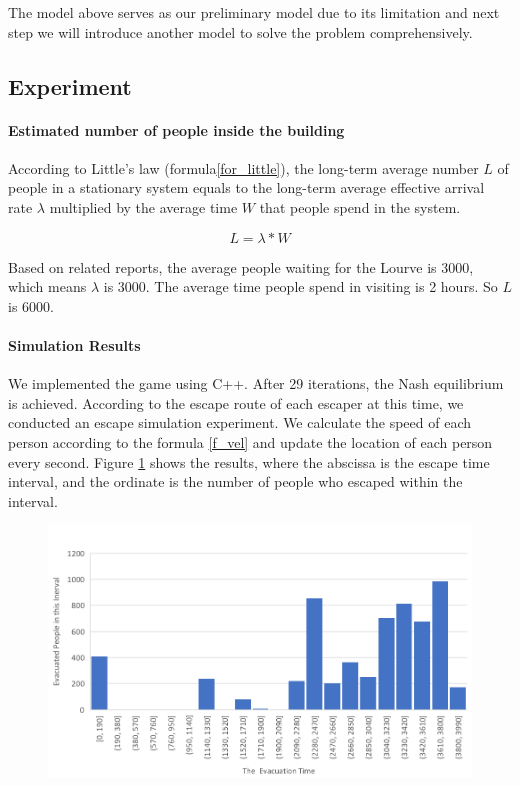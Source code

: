 \documentclass{mcmthesis}
\begin{document}
	The model above serves as our preliminary model due to its limitation and next step we will introduce another model to solve the problem comprehensively.
	
	\subsection{Experiment}
	
	\paragraph{Estimated number of people inside the building}
	According to Little's law (formula\ref{for_little}), the long-term average number $L$ of people in a stationary system equals to the long-term average effective arrival rate $\lambda$ multiplied by the average time $W$ that people spend in the system.
	
	\begin{equation}
	{L=\lambda*W}
	\label{for_little}
	\end{equation}
	
	Based on related reports\cite{waittime}, the average people waiting for the Lourve is 3000, which means $\lambda$ is 3000. The average time people spend in visiting is 2 hours. So $L$ is 6000.
	
	
	
	\paragraph{Simulation Results}
	We implemented the game using C++. After 29 iterations, the Nash equilibrium is achieved.  According to the escape route of each escaper at this time, we conducted an escape simulation experiment. We calculate the speed of each person according to the formula \ref{f_vel} and update the location of each person every second. Figure \ref{fig:screenshot001} shows the results, where the abscissa is the escape time interval, and the ordinate is the number of people who escaped within the interval. 
	
	\begin{figure}
		\centering
		\includegraphics[width=0.7\linewidth]{../../Figure/screenshot001}
		\caption{}
		\label{fig:screenshot001}
	\end{figure}
	
\end{document}
